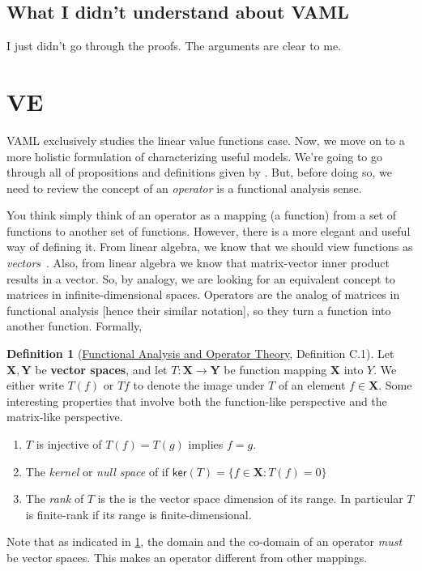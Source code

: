 \documentclass[a4paper]{article}
\theoremstyle{definition}
\newtheorem{definition}{Definition}
\theoremstyle{remark}
\theoremstyle{plain}
\newcommand{\bX}{\mathbf{X}}
\newcommand{\bY}{\mathbf{Y}}
\begin{document}
\subsection{What I didn't understand about VAML}
I just didn't go through the proofs. The arguments are clear to me.

\section{VE}
VAML exclusively studies the linear value functions case. Now, we move on to a more holistic formulation of characterizing useful models. We're going to go through all of propositions and definitions given by \citet{grimm2020value}. But, before doing so, we need to review the concept of an \emph{operator} is a functional analysis sense. 

You think simply think of an operator as a mapping (a function) from a set of functions to another set of functions. However, there is a more elegant and useful way of defining it. From linear algebra, we know that we should view functions as \emph{vectors}~\citep{strang2022introduction}. Also, from linear algebra we know that matrix-vector inner product results in a vector. So, by analogy, we are looking for an equivalent concept to matrices in infinite-dimensional spaces. Operators are the analog of matrices in functional analysis [hence their similar notation], so they turn a function into another function. Formally,
%
\begin{definition}[{\normalfont \href{https://heil.math.gatech.edu/7338/fall09/appendixc_1.pdf?utm_source=chatgpt.com}{Functional Analysis and Operator Theory}, Definition C.1}]
\label{def:operator}
Let $\bX, \bY $ be \textbf{vector spaces}, and let $T: \bX \to \bY$ be function mapping $\bX$ into $Y$. We either write $T(f)$ or $Tf$ to denote the image under $T$ of an element $f \in \bX$. Some interesting properties that involve both the function-like perspective and the matrix-like perspective.
\begin{enumerate}[label=(\Alph*)]
    \item $T$ is injective of $T(f) = T(g)$ implies $f = g$.
    \item The \emph{kernel} or \emph{null space} of if $\textsf{ker}(T) = \{f \in \bX: T(f) = 0\}$
    \item The \emph{rank} of $T$ is the is the vector space dimension of its range. In particular $T$ is finite-rank if its range is finite-dimensional.
\end{enumerate}
\end{definition}
Note that as indicated in \cref{def:operator}, the domain and the co-domain of an operator \emph{must} be vector spaces. This makes an operator different from other mappings.
\end{document}
